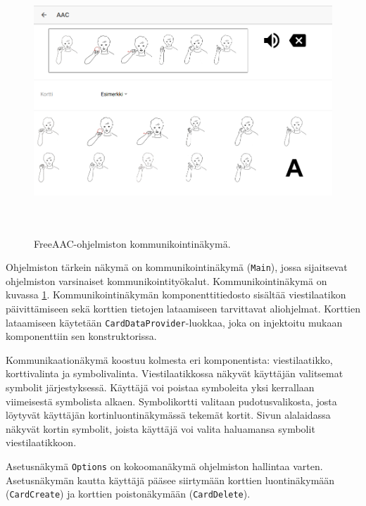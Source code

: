 \documentclass[utf8]{gradu3}
\begin{document}
\begin{figure}[h]\centering
  \includegraphics[height=10cm,keepaspectratio]{main-view-layout}
  \caption[FreeAAC-ohjelmiston kommunikointinäkymä.]
  {FreeAAC-ohjelmiston kommunikointinäkymä.}
  \label{fig:main-view-layout}
\end{figure}

Ohjelmiston tärkein näkymä on kommunikointinäkymä (\texttt{Main}), jossa sijaitsevat ohjelmiston varsinaiset kommunikointityökalut. Kommunikointinäkymä on kuvassa \ref{fig:main-view-layout}. Kommunikointinäkymän komponenttitiedosto sisältää viestilaatikon päivittämiseen sekä korttien tietojen lataamiseen tarvittavat aliohjelmat. Korttien lataamiseen käytetään \texttt{CardDataProvider}-luokkaa, joka on injektoitu mukaan komponenttiin sen konstruktorissa.

Kommunikaationäkymä koostuu kolmesta eri komponentista: viestilaatikko, korttivalinta ja symbolivalinta. Viestilaatikkossa näkyvät käyttäjän valitsemat symbolit järjestyksessä. Käyttäjä voi poistaa symboleita yksi kerrallaan viimeisestä symbolista alkaen. Symbolikortti valitaan pudotusvalikosta, josta löytyvät käyttäjän kortinluontinäkymässä tekemät kortit. Sivun alalaidassa näkyvät kortin symbolit, joista käyttäjä voi valita haluamansa symbolit viestilaatikkoon.

Asetusnäkymä \texttt{Options} on kokoomanäkymä ohjelmiston hallintaa varten. Asetusnäkymän kautta käyttäjä pääsee siirtymään korttien luontinäkymään (\texttt{CardCreate}) ja korttien poistonäkymään (\texttt{CardDelete}).
\end{document}
